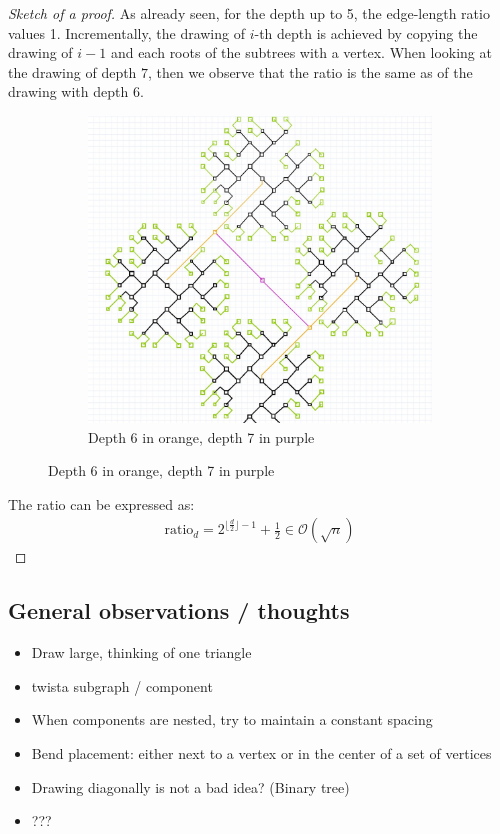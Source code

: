 \begin{proof}[Sketch of a proof]
	As already seen, for the depth up to 5, the edge-length ratio values 1. Incrementally, the drawing of $i$-th depth is achieved by copying the drawing of $i-1$ and each roots of the subtrees with a vertex. When looking at the drawing of depth $7$, then we observe that the ratio is the same as of the drawing with depth 6.
			\begin{figure}[H]
		\centering
		\begin{subfigure}{0.8\textwidth}
			\centering
			\includegraphics[width=\linewidth]{drawings/bintree-with-bends-depth-7.jpg}
			\caption*{Depth 6 in orange, depth 7 in purple}
		\end{subfigure}
	\end{figure}
	The ratio can be expressed as:
	\begin{align*}
		\text{ratio}_d = 2^{\lfloor\frac{d}{2}\rfloor-1} + \frac{1}{2}\in \mathcal{O}(\sqrt{n})
	\end{align*}
\end{proof}
\subsection{General observations / thoughts}
\begin{itemize}
	\item Draw large, thinking of one triangle
	\item \grqq twist\grqq a subgraph / component
	\item When components are nested, try to maintain a constant spacing
	\item Bend placement: either next to a vertex or in the center of a set of vertices
	\item Drawing diagonally is not a bad idea? (Binary tree)
	\item ???
\end{itemize}
